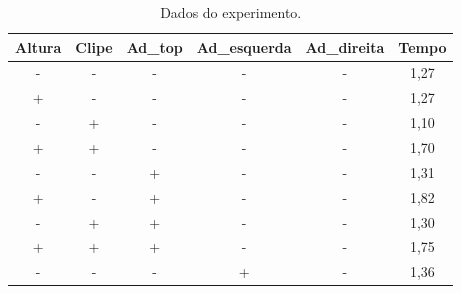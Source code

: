 \begin{table}[H]
  \centering
  \caption{Dados do experimento.}
  \begin{tabular}{|c|c|c|c|c|c|}
  \hline
  \rowcolor[HTML]{EFEFEF} 
  \textbf{Altura}           & \textbf{Clipe}            & \textbf{Ad\_top}          & \textbf{Ad\_esquerda}     & \textbf{Ad\_direita} & \textbf{Tempo}               \\ \hline
  \rowcolor[HTML]{FFFFFF} 
  -                         & -                         & -                         & -                         & -                    & 1,27                         \\ \hline
  \rowcolor[HTML]{EFEFEF} 
  +                         & -                         & -                         & -                         & -                    & 1,27                         \\ \hline
  \rowcolor[HTML]{FFFFFF} 
  -                         & +                         & -                         & -                         & -                    & 1,10                         \\ \hline
  \rowcolor[HTML]{EFEFEF} 
  +                         & +                         & -                         & -                         & -                    & 1,70                         \\ \hline
  \rowcolor[HTML]{FFFFFF} 
  -                         & -                         & +                         & -                         & -                    & 1,31                         \\ \hline
  \rowcolor[HTML]{EFEFEF} 
  +                         & -                         & +                         & -                         & -                    & 1,82                         \\ \hline
  \rowcolor[HTML]{FFFFFF} 
  -                         & +                         & +                         & -                         & -                    & 1,30                         \\ \hline
  \rowcolor[HTML]{EFEFEF} 
  +                         & +                         & +                         & -                         & -                    & 1,75                         \\ \hline
  \rowcolor[HTML]{FFFFFF} 
  -                         & -                         & -                         & +                         & -                    & 1,36                         \\ \hline

\end{tabular}
\end{table}
